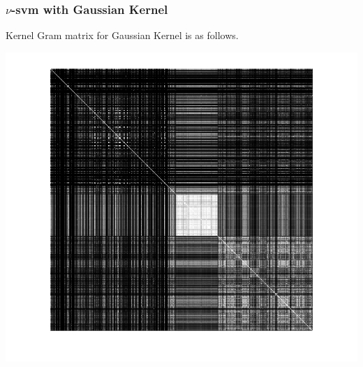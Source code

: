 \documentclass{article}
\begin{document}
\subsubsection{$\nu$-svm with Gaussian Kernel}
Kernel Gram matrix for Gaussian Kernel is as follows.
\begin{center}
\includegraphics[scale=1]{Classification/2/nu_g/kgm}
\end{center}
\end{document}
